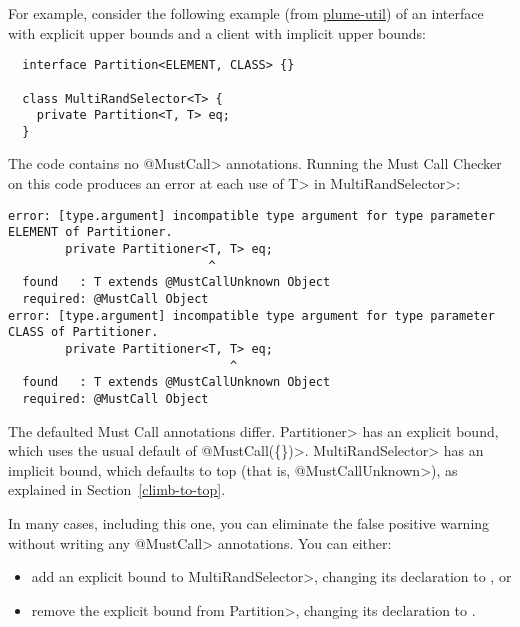 For example, consider the following example (from
\href{https://github.com/plume-lib/plume-util}{plume-util}) of an
interface with explicit upper bounds and a client with implicit upper
bounds:
\begin{Verbatim}
  interface Partition<ELEMENT, CLASS> {}

  class MultiRandSelector<T> {
    private Partition<T, T> eq;
  }
\end{Verbatim}

The code contains no \<@MustCall> annotations.
Running the Must Call Checker on this code produces an error at each use
of \<T> in \<MultiRandSelector>:

\begin{smaller}
\begin{Verbatim}
error: [type.argument] incompatible type argument for type parameter ELEMENT of Partitioner.
        private Partitioner<T, T> eq;
                            ^
  found   : T extends @MustCallUnknown Object
  required: @MustCall Object
error: [type.argument] incompatible type argument for type parameter CLASS of Partitioner.
        private Partitioner<T, T> eq;
                               ^
  found   : T extends @MustCallUnknown Object
  required: @MustCall Object
\end{Verbatim}
\end{smaller}

The defaulted Must Call annotations differ.
\<Partitioner> has an explicit bound, which uses the usual default of \<@MustCall(\{\})>.
\<MultiRandSelector> has an implicit bound, which defaults to top (that is,
\<@MustCallUnknown>), as explained in Section~\ref{climb-to-top}.

In many cases, including this one, you can eliminate the false positive
warning without writing any \<@MustCall> annotations.
You can either:
\begin{itemize}
\item
  add an explicit bound to \<MultiRandSelector>, changing its declaration to
  , or
\item remove the explicit bound from \<Partition>, changing its declaration to
  .
\end{itemize}

